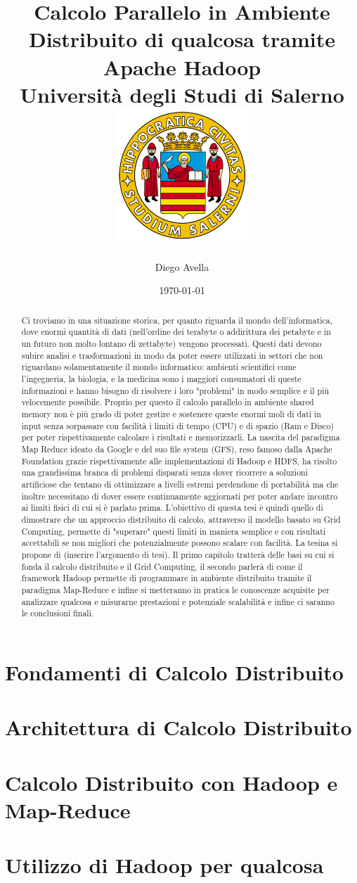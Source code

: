 \documentclass[12pt]{report}
\title{
  {Calcolo Parallelo in Ambiente Distribuito di qualcosa tramite Apache Hadoop}\\
  {\large Università degli Studi di Salerno}\\
  {\includegraphics[width=5cm, height=5cm]{logo_standard.png}}
}
\author{Diego Avella}
\date{\today}
\begin{document}
  \maketitle
  \begin{abstract}
    Ci troviamo in una situazione storica, per quanto riguarda il mondo dell'informatica, dove enormi quantità di dati (nell'ordine dei terabyte o addirittura dei petabyte e in un  futuro non molto lontano di zettabyte) vengono processati. Questi dati devono subire analisi e trasformazioni in modo da poter essere utilizzati in settori che non riguardano solamentamente il mondo informatico: ambienti scientifici come l'ingegneria, la biologia, e la medicina sono i maggiori consumatori di queste informazioni e hanno bisogno di risolvere i loro "problemi" in modo semplice e il più velocemente possibile. Proprio per questo il calcolo parallelo in ambiente shared memory non è più grado di poter gestire e sostenere queste enormi moli di dati in input senza sorpassare con facilità i limiti di tempo (CPU) e di spazio (Ram e Disco) per poter rispettivamente calcolare i risultati e memorizzarli. La nascita del paradigma Map Reduce ideato da Google e del suo file system (GFS), reso famoso dalla Apache Foundation grazie rispettivamente alle implementazioni di Hadoop e HDFS, ha risolto una grandissima branca di problemi disparati senza dover ricorrere a soluzioni artificiose che tentano di ottimizzare a livelli estremi perdendone di portabilità ma che inoltre necessitano di dover essere continuamente aggiornati per poter andare incontro ai limiti fisici di cui si è parlato prima. L'obiettivo di questa tesi è quindi quello di dimostrare che un approccio distribuito di calcolo, attraverso il modello basato su Grid Computing, permette di "superare" questi limiti in maniera semplice e con risultati accettabili se non migliori che potenzialmente possono scalare con facilità. La tesina si propone di (inserire l'argomento di tesi). Il primo capitolo tratterà delle basi su cui si fonda il calcolo distribuito e il Grid Computing, il secondo parlerà di come il framework Hadoop permette di programmare in ambiente distribuito tramite il paradigma Map-Reduce e infine si metteranno in pratica le conoscenze acquisite per analizzare qualcosa e misurarne prestazioni e potenziale scalabilità e infine ci saranno le conclusioni finali.
  \end{abstract}
  \tableofcontents
  \chapter{Fondamenti di Calcolo Distribuito}
  
  \chapter{Architettura di Calcolo Distribuito}
  
  \chapter{Calcolo Distribuito con Hadoop e Map-Reduce}
  
  \chapter{Utilizzo di Hadoop per qualcosa}
  
  
\end{document}
